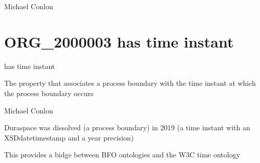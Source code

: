 \documentclass[letterpaper,10pt,english]{sphinxmanual}
\begin{document}
\begin{sphinxShadowBox}

\sphinxAtStartPar
Michael Conlon 
\end{sphinxShadowBox}
\begin{quote}
\label{\detokenize{doc-ORG_2000003:org-2000003}}\label{\detokenize{doc-ORG_2000003:has-time-instant}}\label{\detokenize{doc-ORG_2000003:org-2000003}}
\ignorespaces \end{quote}


\section{ORG\_2000003 \sphinxhyphen{} has time instant}
\label{\detokenize{doc-ORG_2000003:org-2000003-has-time-instant}}\label{\detokenize{doc-ORG_2000003:index-0}}\label{\detokenize{doc-ORG_2000003::doc}}
\begin{sphinxShadowBox}

\sphinxAtStartPar
has time instant
\end{sphinxShadowBox}

\begin{sphinxShadowBox}

\sphinxAtStartPar
The property that associates a process boundary with the time instant at which the process boundary occurs
\end{sphinxShadowBox}

\begin{sphinxShadowBox}

\sphinxAtStartPar
Michael Conlon 
\end{sphinxShadowBox}

\begin{sphinxShadowBox}

\sphinxAtStartPar
Duraspace was dissolved (a process boundary) in 2019 (a time instant with an XSDdatetimestamp and a year precision)
\end{sphinxShadowBox}

\begin{sphinxShadowBox}

\sphinxAtStartPar
This provides a bidge between BFO ontologies and the W3C time ontology
\end{sphinxShadowBox}
\end{document}
